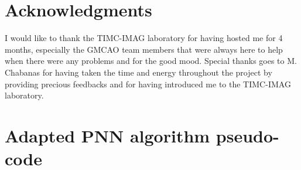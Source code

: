 \documentclass[12pt,journal,compsoc]{IEEEtran}
\begin{document}
\section*{Acknowledgments}
I would like to thank the TIMC-IMAG laboratory for having hosted me for 4 months, especially the GMCAO team members that were always here to help when there were any problems and for the good mood. Special thanks goes to M. Chabanas for having taken the time and energy throughout the project by providing precious feedbacks and for having introduced me to the TIMC-IMAG laboratory.

\appendices

\section{Adapted PNN algorithm pseudo-code}
\end{document}
